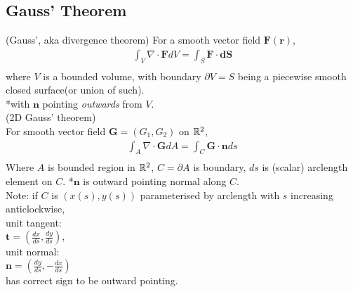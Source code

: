 \documentclass[a4paper]{article}
\begin{document}
\subsection{Gauss' Theorem}
\begin{thm}(Gauss', aka divergence theorem)
For a smooth vector field $\mathbf{F}\left(\mathbf{r}\right)$,
\begin{equation*}
\begin{aligned}
\int_{V} \nabla\cdot\mathbf{F} dV = \int_{S} \mathbf{F}\cdot\mathbf{dS}\\
\end{aligned}
\end{equation*}
where $V$ is a bounded volume, with boundary $\partial V=S$ being a piecewise smooth closed surface(or union of such).\\
*with $\mathbf{n}$ pointing \emph{outwards} from $V$.\\

(2D Gauss' theorem)\\
For smooth vector field $\mathbf{G}=\left(G_{1},G_{2}\right)$ on $\mathbb{R}^2$,\\
\begin{equation*}
\begin{aligned}
\int_{A} \nabla\cdot\mathbf{G} dA = \int_{C} \mathbf{G}\cdot\mathbf{n} ds\\
\end{aligned}
\end{equation*}
Where $A$ is bounded region in $\mathbb{R}^2$, $C=\partial A$ is boundary, $ds$ is (scalar) arclength element on $C$.
*$\mathbf{n}$ is outward pointing normal along $C$.\\

Note: if $C$ is $\left(x\left(s\right),y\left(s\right)\right)$ parameterised by arclength with $s$ increasing anticlockwise,\\
unit tangent:\\
$\mathbf{t}=\left(\frac{dx}{ds},\frac{dy}{ds}\right)$,\\
unit normal:\\
$\mathbf{n}=\left(\frac{dy}{ds},-\frac{dx}{ds}\right)$\\
has correct sign to be outward pointing.\\


\end{thm}
\end{document}
